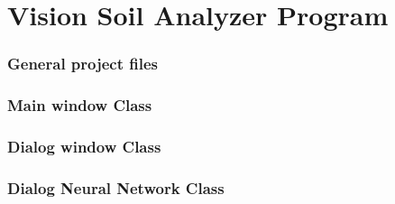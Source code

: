 \documentclass[11pt,fleqn,,a4paper,twoside,openright]{book}
\begin{document}
\chapter{Vision Soil Analyzer Program}
\subsection*{General project files}


\newpage
\subsection*{Main window Class}


\newpage
\subsection*{Dialog window Class}


\newpage
\subsection*{Dialog Neural Network Class}


\newpage
\end{document}
